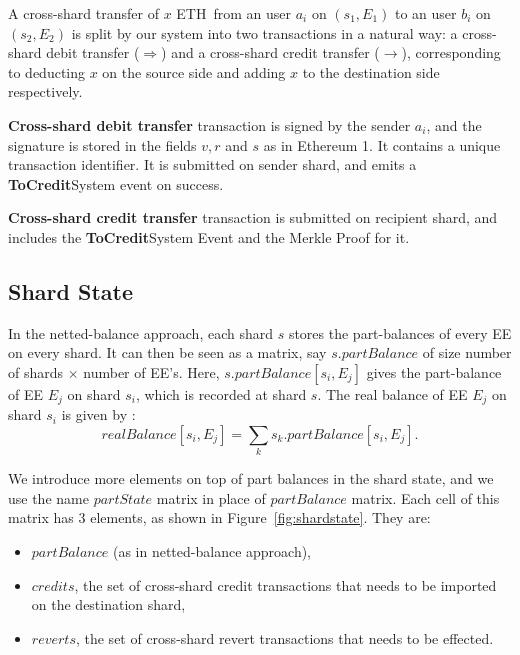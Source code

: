 \documentclass{article}
\newcommand{\eth}[0]{ETH~}
\newcommand{\tocredit}[0]{{\bf ToCredit}}
\begin{document}
A cross-shard transfer of $x$ \eth from an user $a_i$ on $(s_1,E_1)$ to an user $b_i$ on $(s_2,E_2)$ is split by our system into two transactions in a natural way: a cross-shard debit transfer ($\Longrightarrow$) and a cross-shard credit transfer ($\longrightarrow$), corresponding to deducting $x$ on the source side and adding $x$ to the destination side respectively. 

{\bf Cross-shard debit transfer} transaction is signed by the sender $a_i$, and the signature is stored in the fields $v, r$ and $s$ as in Ethereum 1. It contains a unique transaction identifier. It is submitted on sender shard, and emits a \tocredit System event on success.

{\bf Cross-shard credit transfer} transaction is submitted on recipient shard, and includes the \tocredit System Event and the Merkle Proof for it.

\subsection{Shard State}
In the netted-balance approach, each shard $s$ stores the part-balances of every EE on every shard. It can then be seen as a matrix, say $s.partBalance$ of size number of shards $\times$ number of EE's. Here, $s.partBalance[s_i,E_j]$ gives the part-balance of EE $E_j$ on shard $s_i$, which is recorded at shard $s$. The real balance of EE $E_j$ on shard $s_i$ is given by : 
\[
	realBalance[s_i,E_j] = \sum_k s_k.partBalance[s_i,E_j].
\]

We introduce more elements on top of part balances in the shard state, and we use the name $partState$ matrix in place of $partBalance$ matrix. Each cell of this matrix has 3 elements, as shown in Figure~\ref{fig:shardstate}. They are:
\begin{itemize}
	\item $partBalance$ (as in netted-balance approach),
	\item $credits$, the set of cross-shard credit transactions that needs to be imported on the destination shard,
	\item $reverts$, the set of cross-shard revert transactions that needs to be effected.
\end{itemize}
\end{document}
